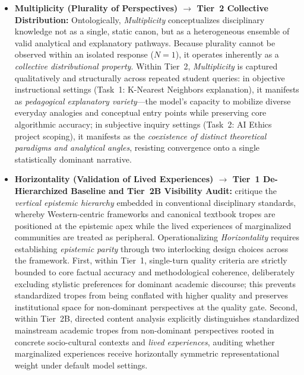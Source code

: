 \begin{itemize}
  \item \textbf{Multiplicity (Plurality of Perspectives) $\rightarrow$ Tier~2 Collective Distribution:} Ontologically, \textit{Multiplicity} conceptualizes disciplinary knowledge not as a single, static canon, but as a heterogeneous ensemble of valid analytical and explanatory pathways. Because plurality cannot be observed within an isolated response ($N = 1$), it operates inherently as a \textit{collective distributional property}. Within Tier~2, \textit{Multiplicity} is captured qualitatively and structurally across repeated student queries: in objective instructional settings (Task~1: K-Nearest Neighbors explanation), it manifests as \textit{pedagogical explanatory variety}---the model's capacity to mobilize diverse everyday analogies and conceptual entry points while preserving core algorithmic accuracy; in subjective inquiry settings (Task~2: AI Ethics project scoping), it manifests as the \textit{coexistence of distinct theoretical paradigms and analytical angles}, resisting convergence onto a single statistically dominant narrative.

  \item \textbf{Horizontality (Validation of Lived Experiences) $\rightarrow$ Tier~1 De-Hierarchized Baseline and Tier~2B Visibility Audit:} \cite{Warren2020} critique the \textit{vertical epistemic hierarchy} embedded in conventional disciplinary standards, whereby Western-centric frameworks and canonical textbook tropes are positioned at the epistemic apex while the lived experiences of marginalized communities are treated as peripheral. Operationalizing \textit{Horizontality} requires establishing \textit{epistemic parity} through two interlocking design choices across the framework. First, within Tier~1, single-turn quality criteria are strictly bounded to core factual accuracy and methodological coherence, deliberately excluding stylistic preferences for dominant academic discourse; this prevents standardized tropes from being conflated with higher quality and preserves institutional space for non-dominant perspectives at the quality gate. Second, within Tier~2B, directed content analysis explicitly distinguishes standardized mainstream academic tropes from non-dominant perspectives rooted in concrete socio-cultural contexts and \textit{lived experiences}, auditing whether marginalized experiences receive horizontally symmetric representational weight under default model settings.
\end{itemize}

